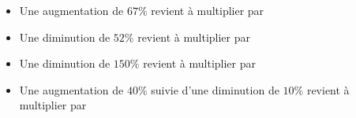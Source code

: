 \documentclass{beamer}
\begin{document}
\begin{frame}
	\begin{itemize}
		\item Une augmentation de $67\%$ revient à multiplier par 
		\item Une diminution de $52\%$ revient à multiplier par 
		\item Une diminution de $150\%$ revient à multiplier par 
		\item Une augmentation de $40\%$ suivie d'une diminution de $10\%$ revient à multiplier par 
	\end{itemize}
\end{frame}
\end{document}
